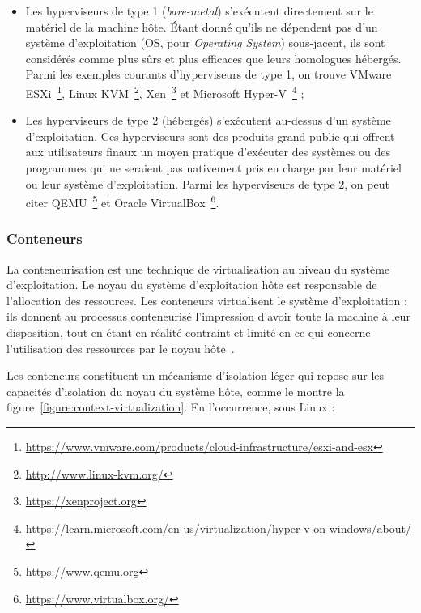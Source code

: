 \begin{itemize}
    \item Les hyperviseurs de type 1 (\textit{bare-metal}) s'exécutent directement sur le matériel de la machine hôte. Étant donné qu'ils ne dépendent pas d'un système d'exploitation (\gls{OS}, pour \textit{Operating System}) sous-jacent, ils sont considérés comme plus sûrs et plus efficaces que leurs homologues hébergés. Parmi les exemples courants d'hyperviseurs de type 1, on trouve VMware ESXi~\footnote{\href{https://www.vmware.com/products/cloud-infrastructure/esxi-and-esx}{https://www.vmware.com/products/cloud-infrastructure/esxi-and-esx}}, Linux KVM~\footnote{\href{http://www.linux-kvm.org/}{http://www.linux-kvm.org/}}, Xen~\footnote{\href{https://xenproject.org/}{https://xenproject.org}} et Microsoft Hyper-V~\footnote{\href{https://learn.microsoft.com/en-us/virtualization/hyper-v-on-windows/about/}{https://learn.microsoft.com/en-us/virtualization/hyper-v-on-windows/about/}} ;
    \item Les hyperviseurs de type 2 (hébergés) s'exécutent au-dessus d'un système d'exploitation. Ces hyperviseurs sont des produits grand public qui offrent aux utilisateurs finaux un moyen pratique d'exécuter des systèmes ou des programmes qui ne seraient pas nativement pris en charge par leur matériel ou leur système d'exploitation. Parmi les hyperviseurs de type 2, on peut citer QEMU~\footnote{\href{https://www.qemu.org/}{https://www.qemu.org}} et Oracle VirtualBox~\footnote{\href{https://www.virtualbox.org/}{https://www.virtualbox.org/}}.
\end{itemize}

\subsubsection{Conteneurs}

La conteneurisation est une technique de virtualisation au niveau du système d'exploitation. Le noyau du système d'exploitation hôte est responsable de l'allocation des ressources. Les conteneurs virtualisent le système d'exploitation : ils donnent au processus conteneurisé l'impression d'avoir toute la machine à leur disposition, tout en étant en réalité contraint et limité en ce qui concerne l'utilisation des ressources par le noyau hôte~\cite{bentalebContainerizationTechnologiesTaxonomies2022}.

Les conteneurs constituent un mécanisme d'isolation léger qui repose sur les capacités d'isolation du noyau du système hôte, comme le montre la figure~\ref{figure:context-virtualization}. En l'occurrence, sous Linux :

